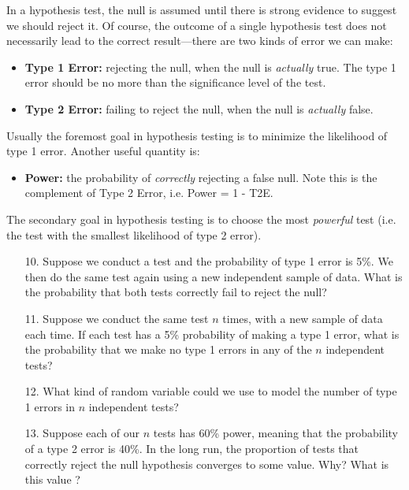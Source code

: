 \documentclass[10pt]{extarticle}
\begin{document}
\hfill 

In a hypothesis test, the null is assumed until there is strong evidence to suggest we should reject it. Of course, the outcome of a single hypothesis test does not necessarily lead to the correct result---there are two kinds of error we can make: 

\begin{itemize}	
	\item {\bf Type 1 Error:} rejecting the null, when the null is {\it actually} true. The type 1 error should be no more than the significance level of the test.  
	\item {\bf Type 2 Error:} failing to reject the null, when the null is {\it actually} false. 
\end{itemize} 

Usually the foremost goal in hypothesis testing is to minimize the likelihood of type 1 error. Another useful quantity is:

\begin{itemize}
	\item {\bf Power:} the probability of {\it correctly} rejecting a false null.  Note this is the complement of Type 2 Error, i.e. Power = 1 - T2E. 
\end{itemize} 

The secondary goal in hypothesis testing is to choose the most {\it powerful} test (i.e. the test with the smallest likelihood of type 2 error). 

\hfill 

\begin{itemize}

	\item[10.] Suppose we conduct a test and the probability of type 1 error  is 5\%. We then do the same test again using a new independent sample of data. What is the probability that both tests correctly fail to reject the null? \\ 

	\item[11.] Suppose we conduct the same test $n$ times, with a new sample of data each time. If each test has a 5\% probability of making a type 1 error, what is the probability that we make no type 1 errors in any of the $n$ independent tests? \\ 

	\item[12.] What kind of random variable could we use to model the number of type 1 errors in $n$ independent tests? \\ 

	\item[13.] Suppose each of our $n$ tests has 60\% power, meaning that the probability of a type 2 error is 40\%. In the long run, the proportion of tests that correctly reject the null hypothesis converges to some value. Why? What is this value ? \\

\end{itemize}
\end{document}
